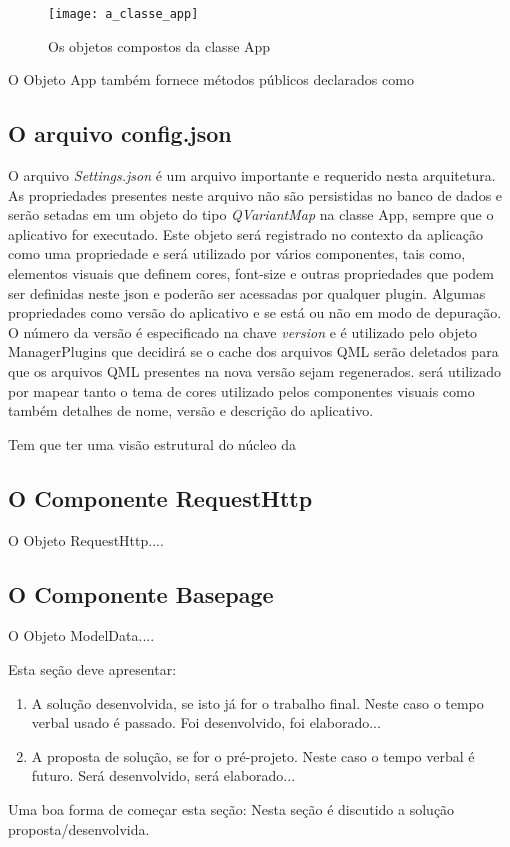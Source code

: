 \begin{figure}[h]
	\texttt{[image: a\_classe\_app]}
	\centering
	\caption{Os objetos compostos da classe App}
\end{figure}

O Objeto App também fornece métodos públicos declarados como 

\subsection{O arquivo config.json}\label{sec:solucao-desenvolvida}
O arquivo \textit{Settings.json} é um arquivo importante e requerido nesta arquitetura. As propriedades presentes neste arquivo não são persistidas no banco de dados e serão setadas em um objeto do tipo \textit{QVariantMap} na classe App, sempre que o aplicativo for executado. Este objeto será registrado no contexto da aplicação como uma propriedade e será utilizado por vários componentes, tais como, elementos visuais que definem cores, font-size e outras propriedades que podem ser definidas neste json e poderão ser acessadas por qualquer plugin. Algumas propriedades como versão do aplicativo e se está ou não em modo de depuração. O número da versão é especificado na chave \textit{version} e é utilizado pelo objeto ManagerPlugins que decidirá se o cache dos arquivos QML serão deletados para que os arquivos QML presentes na nova versão sejam regenerados. será utilizado por mapear tanto o tema de cores utilizado pelos componentes visuais como também detalhes de nome, versão e descrição do aplicativo.

Tem que ter uma visão estrutural do núcleo da 

\subsection{O Componente RequestHttp}\label{sec:solucao-desenvolvida}
O Objeto RequestHttp....

\subsection{O Componente Basepage}\label{sec:solucao-desenvolvida}
O Objeto ModelData....

Esta seção deve apresentar: 
\begin{enumerate}
\item A solução desenvolvida, se isto já for o trabalho final. Neste caso o tempo verbal usado é passado. Foi desenvolvido, foi elaborado...
\item A proposta de solução, se for o pré-projeto. Neste caso o tempo verbal é futuro. Será desenvolvido, será elaborado...
\end{enumerate}
Uma boa forma de começar esta seção:
Nesta seção é discutido a solução proposta/desenvolvida.

